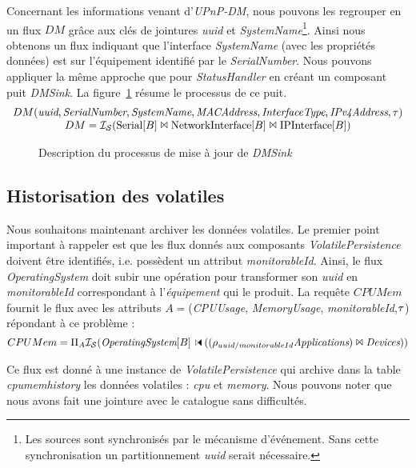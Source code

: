 Concernant les informations venant d'\textit{UPnP-DM}, nous pouvons les regrouper en un flux $DM$ grâce aux clés de jointures \textit{uuid} et \textit{SystemName}\footnote{Les sources sont synchronisés par le mécanisme d'événement. Sans cette synchronisation un partitionnement \textit{uuid} serait nécessaire.}. Ainsi nous obtenons un flux indiquant que l'interface \textit{SystemName} (avec les propriétés données) est sur l'équipement identifié par le \textit{SerialNumber}. Nous pouvons appliquer la même approche que pour \textit{StatusHandler} en créant un composant puit \textit{DMSink}. La figure~\ref{fig:valid:domvision:dmhandler} résume le processus de ce puit.
$$\begin{array}{c} DM(\textit{uuid},\textit{SerialNumber},\textit{SystemName},\textit{MACAddress},\textit{InterfaceType}, \textit{IPv4Address}, \tau)\\
 DM = \mathcal{I_S}(\textrm{Serial}[B] \Join \textrm{NetworkInterface}[B] \Join \textrm{IPInterface}[B])\end{array}$$
\begin{figure}[ht]
	\caption{Description du processus de mise à jour de \textit{DMSink}}\label{fig:valid:domvision:dmhandler}
\end{figure}

\subsection{Historisation des volatiles}
Nous souhaitons maintenant archiver les données volatiles. Le premier point important à rappeler est que les flux donnés aux composants \textit{VolatilePersistence} doivent être identifiés, i.e. possèdent un attribut \textit{monitorableId}. Ainsi, le flux \textit{OperatingSystem} doit subir une opération pour transformer son \textit{uuid} en \textit{monitorableId} correspondant à l'\textit{équipement} qui le produit. La requête $CPUMem$ fournit le flux avec les attributs $A=$(\textit{CPUUsage}, \textit{MemoryUsage}, \textit{monitorableId},$\tau$) répondant à ce problème :
$$CPUMem=\Pi_A \IS(\textit{OperatingSystem}[B]\ssjoin ((\rho_{uuid/monitorableId} \textit{Applications}) \Join \textit{Devices}))$$

Ce flux est donné à une instance de \textit{VolatilePersistence} qui archive dans la table \textit{cpumemhistory} les données volatiles : \textit{cpu} et \textit{memory}. Nous pouvons noter que nous avons fait une jointure avec le catalogue sans difficultés.

